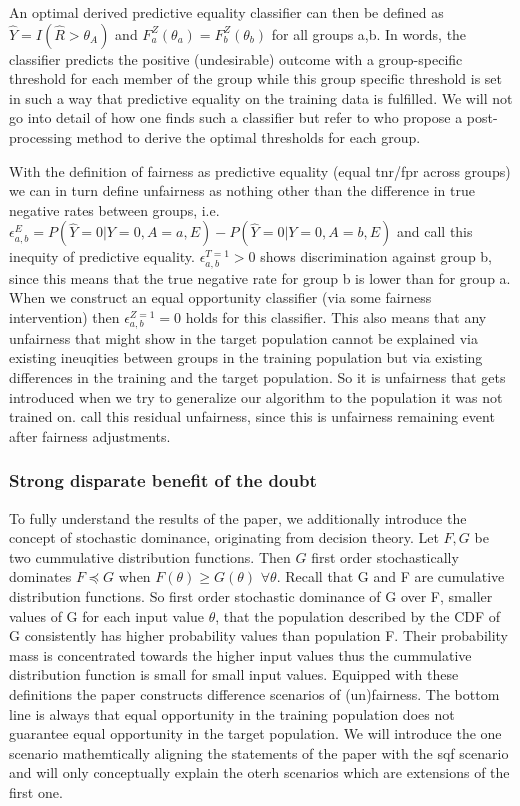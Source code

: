 An optimal derived predictive equality classifier can then be defined as $\hat{Y} = I(\hat{R} > \theta_A)$ and $F_a^Z(\theta_a) = F_b^Z(\theta_b)$ for all groups a,b. In words, the classifier predicts the positive (undesirable)  outcome with a group-specific threshold for each member of the group while this group specific threshold is set in such a way that predictive equality on the training data is fulfilled. We will not go into detail of how one finds such a classifier but refer to \cite{hardt2016} who propose a post-processing method to derive the optimal thresholds for each group. 

With the definition of fairness as predictive equality (equal tnr/fpr across groups) we can in turn define unfairness as nothing other than the difference in true negative rates between groups, i.e. \(\epsilon_{a,b}^E = P(\hat{Y} = 0 | Y = 0, A = a, E) - P(\hat{Y} = 0 | Y = 0, A = b, E)\) and call this inequity of predictive equality. $\epsilon_{a,b}^{T=1} > 0$ shows discrimination against group b, since this means that the true negative rate for group b is lower than for group a.
When we construct an equal opportunity classifier (via some fairness intervention) then $\epsilon_{a,b}^{Z=1} = 0$ holds for this classifier. This also means that any unfairness that might show in the target population cannot be explained via existing ineuqities between groups in the training population but via existing differences in the training and the target population. So it is unfairness that gets introduced when we try to generalize our algorithm to the population it was not trained on. \cite{kallus2018} call this residual unfairness, since this is unfairness remaining event after fairness adjustments.

\subsubsection*{Strong disparate benefit of the doubt}
To fully understand the results of the paper, we additionally introduce the concept of stochastic dominance, originating from decision theory. Let $F, G$ be two cummulative distribution functions. Then $G$ first order stochastically dominates $F \preceq G$ when $F(\theta) \geq G(\theta)$ $\forall\theta$. Recall that G and F are cumulative distribution functions. So first order stochastic dominance of G over F, smaller values of G for each input value $\theta$, that the population described by the CDF of G consistently has higher probability values than population F. Their probability mass is concentrated towards the higher input values thus the cummulative distribution function is small for small input values.
Equipped with these definitions the paper constructs difference scenarios of (un)fairness. The bottom line is always that equal opportunity in the training population does not guarantee equal opportunity in the target population. We will introduce the one scenario mathemtically aligning the statements of the paper with the sqf scenario and will only conceptually explain the oterh scenarios which are extensions of the first one.

